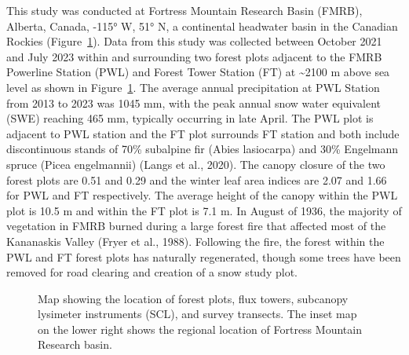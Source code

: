 \documentclass[
  letterpaper,
  DIV=11,
  numbers=noendperiod]{scrartcl}
\begin{document}
This study was conducted at Fortress Mountain Research Basin (FMRB),
Alberta, Canada, -115° W, 51° N, a continental headwater basin in the
Canadian Rockies (Figure~\ref{fig-site-map}). Data from this study was
collected between October 2021 and July 2023 within and surrounding two
forest plots adjacent to the FMRB Powerline Station (PWL) and Forest
Tower Station (FT) at \textasciitilde2100 m above sea level as shown in
Figure~\ref{fig-site-map}. The average annual precipitation at PWL
Station from 2013 to 2023 was 1045 mm, with the peak annual snow water
equivalent (SWE) reaching 465 mm, typically occurring in late April. The
PWL plot is adjacent to PWL station and the FT plot surrounds FT station
and both include discontinuous stands of 70\% subalpine fir (Abies
lasiocarpa) and 30\% Engelmann spruce (Picea engelmannii) (Langs et al.,
2020). The canopy closure of the two forest plots are 0.51 and 0.29 and
the winter leaf area indices are 2.07 and 1.66 for PWL and FT
respectively. The average height of the canopy within the PWL plot is
10.5 m and within the FT plot is 7.1 m. In August of 1936, the majority
of vegetation in FMRB burned during a large forest fire that affected
most of the Kananaskis Valley (Fryer et al., 1988). Following the fire,
the forest within the PWL and FT forest plots has naturally regenerated,
though some trees have been removed for road clearing and creation of a
snow study plot.

\begin{figure}[H]


\caption{\label{fig-site-map}Map showing the location of forest plots,
flux towers, subcanopy lysimeter instruments (SCL), and survey
transects. The inset map on the lower right shows the regional location
of Fortress Mountain Research basin.}

\end{figure}%
\end{document}
